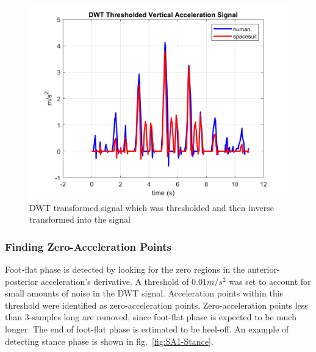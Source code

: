 \documentclass[defaultstyle,11pt]{comps}
\begin{document}
\begin{figure}
\hypertarget{fig:SA1-DWT}{%
\centering
\includegraphics{../fig/SA1/S3C0T1R_DWT.png}
\caption{DWT transformed signal which was thresholded and then inverse transformed into the signal}\label{fig:SA1-DWT}
}
\end{figure}

\hypertarget{finding-zero-acceleration-points}{%
\subsubsection{Finding Zero-Acceleration Points}\label{finding-zero-acceleration-points}}

Foot-flat phase is detected by looking for the zero regions in the anterior-posterior acceleration's derivative\citep{Mariani2013}.
A threshold of \(0.01 m/s^{2}\) was set to account for small amounts of noise in the DWT signal.
Acceleration points within this threshold were identified as zero-acceleration points.
Zero-acceleration points less than 3-samples long are removed, since foot-flat phase is expected to be much longer.
The end of foot-flat phase is estimated to be heel-off. An example of detecting stance phase is shown in fig.~\ref{fig:SA1-Stance}.
\end{document}
